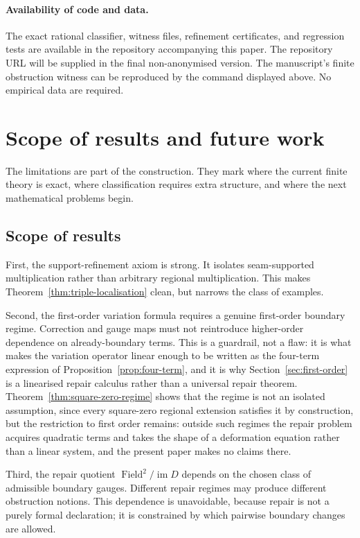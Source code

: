 \documentclass[11pt]{article}
\newcommand{\im}{\operatorname{im}}
\newcommand{\Field}{\operatorname{Field}}
\begin{document}
\paragraph{Availability of code and data.}
The exact rational classifier, witness files, refinement certificates, and regression tests are available in the repository accompanying this paper. The repository URL will be supplied in the final non-anonymised version. The manuscript's finite obstruction witness can be reproduced by the command displayed above. No empirical data are required.

\section{Scope of results and future work}
\label{sec:scope-future}

The limitations are part of the construction. They mark where the current finite theory is exact, where classification requires extra structure, and where the next mathematical problems begin.

\subsection{Scope of results}

First, the support-refinement axiom is strong. It isolates seam-supported multiplication rather than arbitrary regional multiplication. This makes Theorem~\ref{thm:triple-localisation} clean, but narrows the class of examples.

Second, the first-order variation formula requires a genuine first-order boundary regime. Correction and gauge maps must not reintroduce higher-order dependence on already-boundary terms. This is a guardrail, not a flaw: it is what makes the variation operator linear enough to be written as the four-term expression of Proposition~\ref{prop:four-term}, and it is why Section~\ref{sec:first-order} is a linearised repair calculus rather than a universal repair theorem. Theorem~\ref{thm:square-zero-regime} shows that the regime is not an isolated assumption, since every square-zero regional extension satisfies it by construction, but the restriction to first order remains: outside such regimes the repair problem acquires quadratic terms and takes the shape of a deformation equation rather than a linear system, and the present paper makes no claims there.

Third, the repair quotient \(\Field^2/\im D\) depends on the chosen class of admissible boundary gauges. Different repair regimes may produce different obstruction notions. This dependence is unavoidable, because repair is not a purely formal declaration; it is constrained by which pairwise boundary changes are allowed.
\end{document}
